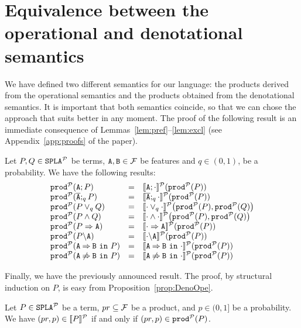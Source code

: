 \section{Equivalence between the operational and denotational semantics}\label{sec:equivalenceMain}
We have defined two different semantics for our language:
the products derived from the operational semantics and the products
obtained from the denotational semantics. It is important that
both semantics coincide, so that we can chose the approach that suits
better in any moment. The proof of the following result is an immediate consequence of Lemmas~\ref{lem:pref}--\ref{lem:excl} (see Appendix~\ref{app:proofs} of the paper).

\bprop\label{prop:DenoOpe}
  Let $P,Q\in\mathtt{SPLA{^{\cal P}}}$ be terms, $\mathtt{A},\mathtt{B}\in{\cal F}$ be features and $q\in (0,1)$, be a probability. We have the following results:
  $$\begin{array}{lll}
  \prodp(\feature{A};P)&=&\semdenp{\feature{A};\cdot}(\prodp(P))\\
  \prodp(\ofeature{A};_qP)&=&\semdenp{\ofeature{A};_q\cdot}(\prodp(P))\\
  \prodp(P\choice_q Q)&=&\semdenp{\cdot\choice_q\cdot}\bigl(\prodp(P),\prodp(Q)\bigr)\\
  \prodp(P\paral Q)&=&\semdenp{\cdot\paral\cdot}\bigl(\prodp(P),\prodp(Q)\bigr)\\
  \prodp(\mandatory{A}{P})&=&\semdenp{\mandatory{A}{\cdot}}(\prodp(P))\\
  \prodp(\forbid{A}{P})&=&\semdenp{\forbid{A}{\cdot}}(\prodp(P))\\
  \prodp(\require{A}{B}{P})&=&\semdenp{\require{A}{B}{\cdot}}(\prodp(P))\\
  \prodp(\exclude{A}{B}{P})&=&\semdenp{\exclude{A}{B}{\cdot}}(\prodp(P))
\end{array}$$
\eprop

Finally, we have the previously announced result. The proof, by structural induction on $P$, is easy from
Proposition~\ref{prop:DenoOpe}.


\bthm\label{prop:equivprob}
  Let $P\in\mathtt{SPLA{^{\cal P}}}$ be a term, $pr\subseteq{\cal F}$ be a product, and
  $p\in(0,1]$ be a probability. We have $ (pr,p)\in[\![P]\!]^{\cal P}$ if and only if
  $(pr,p)\in\mathtt{prod}^{\cal P}(P)$.
\ethm




